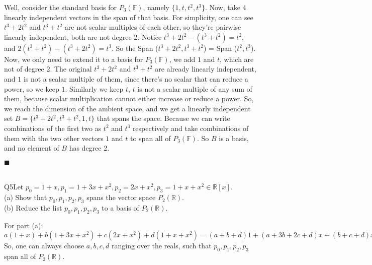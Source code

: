 \documentclass{article}
\begin{document}
Well, consider the standard basis for $P_3(\mathbb{F})$, namely
$\{1,t,t^2,t^3\}$. Now, take 4 linearly independent vectors in the
span of that basis. For simplicity, one can see $t^3+2t^2$ and
$t^3+t^2$ are not scalar multiples of each other, so they're pairwise
linearly independent, both are not degree 2. Notice
$t^3+2t^2-(t^3+t^2)=t^2$, and $2(t^3+t^2)-(t^3+2t^2)=t^3$. So the Span
($t^3+2t^2,t^3+t^2$) = Span ($t^2,t^3$). Now, we only need to extend
it to a basis for $P_3\mathbb{(F)}$, we add $1$ and $t$, which are not
of degree 2. The original $t^3+2t^2$ and
$t^3+t^2$ are already linearly independent, and $1$ is not a scalar
multiple of them, since there's no scalar that can reduce a power, so
we keep $1$. Similarly we keep $t$, $t$ is not a scalar
multiple of any sum of them, because scalar multiplication cannot either increase or
reduce a power. So, we reach the dimension of the ambient space, and
we get a linearly independent set $B = \{t^3+2t^2,
t^3+t^2,1,t\}$ that spans the space. Because we can write combinations
of the first two as $t^2$ and $t^3$ respectively and take combinations of
them with the two other vectors $1$ and $t$ to span all of
$P_3\mathbb{(F)}$. So $B$ is a basis, and no element of $B$ has degree
2.\\
\begin{flushright}$\blacksquare$\end{flushright}\\

Q5\quad Let $p_0 = 1+x, p_1 = 1+3x+x^2 , p_2 = 2x+x^2 , p_3 = 1+x+x^2 \in \mathbb{R}[x].$\\
(a) Show that $p_0 , p_1 , p_2 , p_3$ spans the vector space $P_2(\mathbb{R}).$\\
(b) Reduce the list $p_0 , p_1 , p_2 , p_3$ to a basis of
$P_2(\mathbb{R}).$\\

\vspace{1.618cm}

For part (a):\\
$a(1+x)+b(1+3x+x^2)+c(2x+x^2)+d(1+x+x^2)=(a+b+d)1 + (a+3b+2c+d)x +
(b+c+d)x^2$\\
So, one can always choose $a,b,c,d$ ranging over the reals, such that
$p_0 , p_1 , p_2 , p_3$ span all of $P_2(\mathbb{R}).$\\
\end{document}
